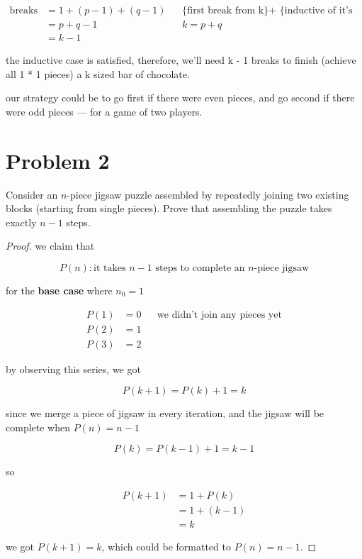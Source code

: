 \[
\begin{aligned}
\text{breaks} &= 1 + (p - 1) + (q - 1) && \text{\{first break from k\} +
\{inductive of it's result\}} \\
&= p + q - 1 && k = p + q \\
&= k - 1
\end{aligned}
\]

the inductive case is satisfied, therefore, we'll need k - 1 breaks to
finish (achieve all 1 * 1 pieces) a k sized bar of chocolate.

\vspace{1em}

our strategy could be to go first if there were even pieces, and go second
if there were odd pieces --- for a game of two players.

\vspace{1em}
\hrulefill

\newpage

\section*{Problem 2}
Consider an $n$-piece jigsaw puzzle assembled by repeatedly joining two existing blocks (starting from single pieces). Prove that assembling the puzzle takes exactly $n-1$ steps.

\medskip
\solution

\begin{proof}

we claim that

\[
P(n) : \text{it takes } n - 1 \text{ steps to complete an } n\text{-piece
jigsaw}
\]

for the \textbf{base case} where $n_0 = 1$

\[
\begin{aligned}
P(1) &= 0 && \text{we didn't join any pieces yet} \\
P(2) &= 1 \\
P(3) &= 2
\end{aligned}
\]

by observing this series, we got

\[
P(k + 1) = P(k) + 1 = k
\]

since we merge a piece of jigsaw in every iteration, and the jigsaw will be
complete when $P(n) = n - 1$

\[
P(k) = P(k - 1) + 1 = k - 1
\]

so

\[
\begin{aligned}
P(k + 1) &= 1 + P(k) \\
&= 1 + (k - 1) \\
&= k
\end{aligned}
\]

we got $P(k + 1) = k$, which could be formatted to $\boxed{P(n) = n - 1}$.
    
\end{proof}

